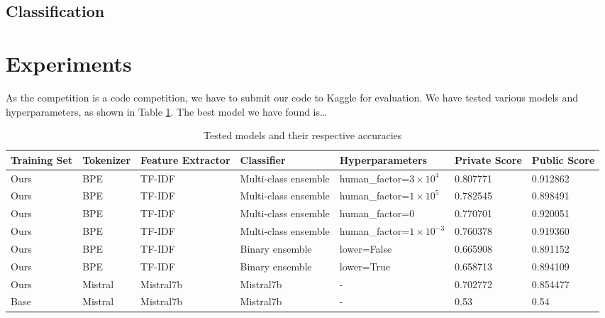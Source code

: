 \documentclass[conference]{IEEEtran}
\begin{document}


\subsection{Classification}

\section{Experiments}

As the competition is a code competition, we have to submit our code to Kaggle for evaluation. We have tested various models and hyperparameters, as shown in Table \ref{tab:models}. The best model we have found is\dots

\begin{table}[htbp]
  \centering
  \caption{Tested models and their respective accuracies}
  \label{tab:models}
  \begin{tabular}{p{1.8cm}p{1.5cm}p{2.3cm}p{3cm}p{3cm}p{1.6cm}p{1.6cm}}
    \hline
    \textbf{Training Set} & \textbf{Tokenizer} & \textbf{Feature Extractor} & \textbf{Classifier} & \textbf{Hyperparameters} & \textbf{Private Score} & \textbf{Public Score} \\
    \hline
    Ours & BPE & TF-IDF & Multi-class ensemble & human\_factor=$3 \times 10^4$ & 0.807771 & 0.912862 \\
    Ours & BPE & TF-IDF & Multi-class ensemble & human\_factor=$1 \times 10^5$ & 0.782545 & 0.898491 \\
    Ours & BPE & TF-IDF & Multi-class ensemble & human\_factor=$0$ & 0.770701 & 0.920051 \\
    Ours & BPE & TF-IDF & Multi-class ensemble & human\_factor=$1 \times 10^{-3}$ & 0.760378 & 0.919360 \\
    Ours & BPE & TF-IDF & Binary ensemble & lower=False & 0.665908 & 0.891152 \\
    Ours & BPE & TF-IDF & Binary ensemble & lower=True & 0.658713 & 0.894109 \\

    Ours & Mistral & Mistral7b & Mistral7b & - & 0.702772 & 0.854477 \\
    Base & Mistral & Mistral7b & Mistral7b & - & 0.53 & 0.54 \\
    \hline
  \end{tabular}

  \vspace{0.5cm}


\end{table}
\end{document}
